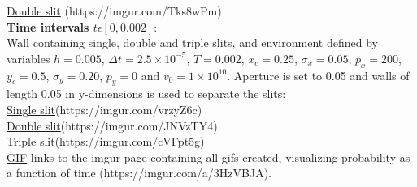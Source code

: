 \documentclass[10pt, nofootinbib, twocolumn]{revtex4-1}
\begin{document}
\href{https://imgur.com/Tks8wPm}{Double slit}\label{gif:double} (https://imgur.com/Tks8wPm)\\

\textbf{Time intervals $t\epsilon [0,0.002]$}:\\
Wall containing single, double and triple slits, and environment defined by variables $h = 0.005$, $\Delta t = 2.5\times10^{-5}$, $T = 0.002$, $x_c = 0.25$, $\sigma_x = 0.05$, $p_x = 200$, $y_c = 0.5$, $\sigma_y = 0.20$, $p_y = 0$ and $v_0 = 1\times10^{10}$. Aperture is set to 0.05 and walls of length 0.05 in y-dimensions is used to separate the slits: \\
\href{https://imgur.com/vrzyZ6c}{Single slit}\label{gif:singlet}(https://imgur.com/vrzyZ6c)\\
\href{https://imgur.com/JNVzTY4}{Double slit}\label{gif:doublet}(https://imgur.com/JNVzTY4)\\
\href{https://imgur.com/cVFpt5g}{Triple slit}\label{gif:triplet}(https://imgur.com/cVFpt5g)\\

\href{https://imgur.com/a/3HzVBJA}{GIF} links to the imgur page containing all gifs created, visualizing  probability as a function of time (https://imgur.com/a/3HzVBJA).

\newpage
\end{document}
